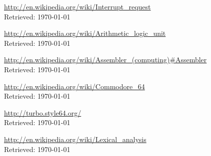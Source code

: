 \documentclass{article}
\begin{document}
\begin{thebibliography}{}
{\url{http://en.wikipedia.org/wiki/Interrupt_request}\\
Retrieved: \today}

{\url{http://en.wikipedia.org/wiki/Arithmetic_logic_unit}\\
Retrieved: \today}

{\url{http://en.wikipedia.org/wiki/Assembler_(computing)#Assembler}\\
Retrieved: \today}

{\url{http://en.wikipedia.org/wiki/Commodore_64}\\
Retrieved: \today}

{\url{http://turbo.style64.org/}\\
Retrieved: \today}

{\url{http://en.wikipedia.org/wiki/Lexical_analysis}\\
Retrieved: \today}




















\end{thebibliography}
\end{document}
